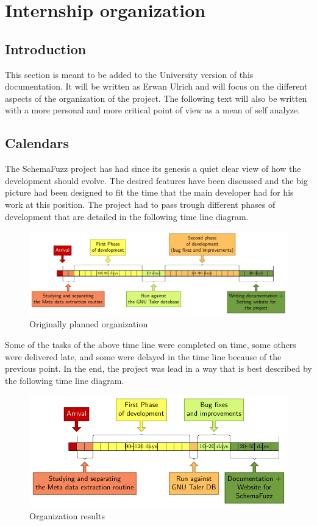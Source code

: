 
\section{Internship organization} 
	\subsection{Introduction}

This section is meant to be added to the University version of this documentation. It will be written as Erwan Ulrich and will focus on the different aspects of the organization of the project. The following text will also be written with a more personal and more critical point of view as a mean of self analyze.

	\subsection{Calendars}
	
The	SchemaFuzz project has had since its genesis a quiet clear view of how the development should evolve. The desired features have been discussed and the big picture had been designed to fit the time that the main developer had for his work at this position.
The project had to pass trough different phases of development that are detailed in the following time line diagram. 

		\bigskip
		\begin{figure} [h!]
			\includegraphics[width=\textwidth]{timelineDiagram.pdf}
			\caption{Originally planned organization}
		\end{figure}
		\bigskip


Some of the tasks of the above time line were completed on time, some others were delivered late, and some were delayed in the time line because of the previous point.
In the end, the project was lead in a way that is best described by the following time line diagram.

		\bigskip
		\begin{figure} [h!]
			\includegraphics[width=\textwidth]{timelineDiagram2.pdf}
			\caption{Organization results}
		\end{figure}
		\bigskip

